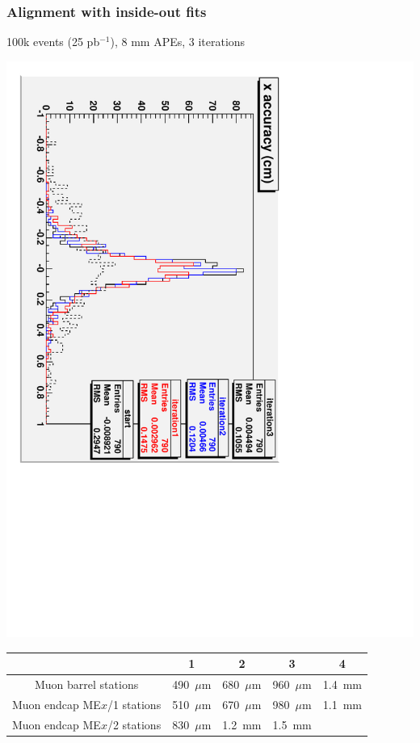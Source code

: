 \documentclass[compress]{beamer}
\begin{document}
\begin{frame}
\frametitle{Alignment with inside-out fits}

100k events (25 pb$^{-1}$), 8 mm APEs, 3 iterations

\begin{center}
\includegraphics[height=0.6\linewidth, angle=90]{xaccuracy_3iters.pdf}
\end{center}

\vspace{-0.25 cm}
\hspace{-0.5 cm} \begin{minipage}{\linewidth}
\begin{tabular}{c c c c c}
& 1 & 2 & 3 & 4 \\\hline
Muon barrel stations & 490~$\mu$m & 680~$\mu$m & 960~$\mu$m & 1.4~mm \\
Muon endcap ME$x$/1 stations & 510~$\mu$m & 670~$\mu$m & 980~$\mu$m & 1.1~mm\\
Muon endcap ME$x$/2 stations & 830~$\mu$m & 1.2~mm & 1.5~mm & \\
\end{tabular}
\end{minipage}
\end{frame}
\end{document}
